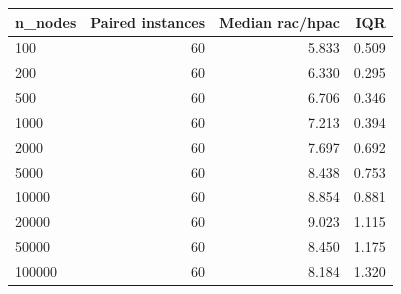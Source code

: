 \begin{tabular}{lrrr}
\toprule
n\_nodes & Paired instances & Median rac/hpac & IQR \\
\midrule
100 & 60 & 5.833 & 0.509 \\
200 & 60 & 6.330 & 0.295 \\
500 & 60 & 6.706 & 0.346 \\
1000 & 60 & 7.213 & 0.394 \\
2000 & 60 & 7.697 & 0.692 \\
5000 & 60 & 8.438 & 0.753 \\
10000 & 60 & 8.854 & 0.881 \\
20000 & 60 & 9.023 & 1.115 \\
50000 & 60 & 8.450 & 1.175 \\
100000 & 60 & 8.184 & 1.320 \\
\bottomrule
\end{tabular}
